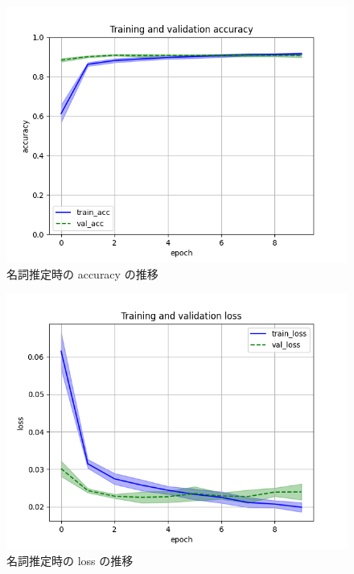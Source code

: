 \documentclass[twocolumn]{jarticle}
\begin{document}
\begin{figure}[tbp]
      \includegraphics[width=\linewidth]{meishi_acc.png}
      \caption{名詞推定時の accuracy の推移}
      \label{fig:mei_acc}
\end{figure}
\begin{figure}[tbp]
      \includegraphics[width=\linewidth]{meishi_loss.png}
      \caption{名詞推定時の loss の推移}
      \label{fig:mei_loss}
\end{figure}
\end{document}
